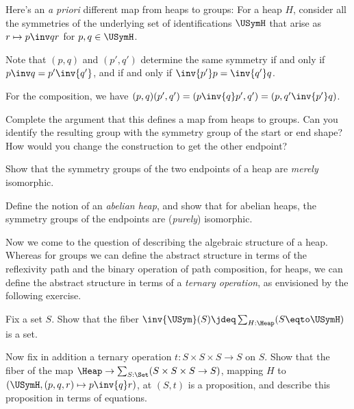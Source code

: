 Here's an \emph{a priori} different map from heaps to groups:
For a heap $H$, consider all the
symmetries of the underlying set of identifications $\USymH$
that arise as $r \mapsto p\inv q r$ for $p,q\in \USymH$.

Note that $(p,q)$ and $(p',q')$ determine the same symmetry
if and only if $p\inv q = p'\inv{q'}$, and if and only if
$\inv{p'}p = \inv{q'}q$.

For the composition, we have $(p,q)(p',q') = (p\inv{q}p',q') = (p,q'\inv{p'}q)$.

\begin{exercise}
  Complete the argument that this defines a map
  from heaps to groups. Can you identify the resulting group
  with the symmetry group of the start or end shape?
  How would you change the construction to get the other endpoint?
\end{exercise}

\begin{exercise}
  Show that the symmetry groups of the two endpoints of a heap
  are \emph{merely} isomorphic.

  Define the notion of an \emph{abelian heap},
  and show that for abelian heaps,
  the symmetry groups of the endpoints are (\emph{purely}) isomorphic.
\end{exercise}

Now we come to the question of describing the algebraic structure
of a heap.
Whereas for groups we can define the abstract structure
in terms of the reflexivity path and the binary operation of path composition,
for heaps, we can define the abstract structure
in terms of a \emph{ternary operation},
as envisioned by the following exercise.

\begin{exercise}\label{xca:heap-variety}
  Fix a set $S$.
  Show that the fiber $\inv{\USym}(S)\jdeq\sum_{H:\Heap}(S\eqto\USymH)$ is a set.

  Now fix in addition a ternary operation $t:S\times S\times S\to S$ on $S$.
  Show that the fiber of the map $\Heap \to \sum_{S:\Set}(S\times S\times S \to S)$,
  mapping $H$ to $(\USymH,(p,q,r)\mapsto p \inv{q} r)$,
  at $(S,t)$ is a proposition,
  and describe this proposition in terms of equations.
\end{exercise}



